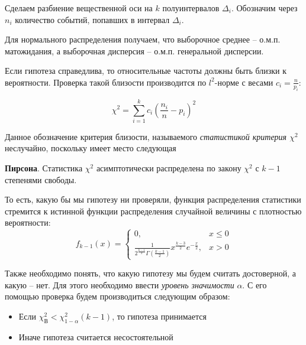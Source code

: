 Сделаем разбиение вещественной оси на $k$ полуинтервалов $\Delta_i$. Обозначим через $n_i$ количество событий, попавших в интервал $\Delta_i$.

Для нормального распределения получаем, что выборочное среднее -- о.м.п. матожидания, а выборочная дисперсия -- о.м.п. генеральной дисперсии.
	
Если гипотеза справедлива, то относительные частоты должны быть близки к вероятности. Проверка такой близости производится по $l^2$-норме с весами $c_i=\frac{n}{p_i}$:
	
\begin{equation}
	\chi^2 = \displaystyle \sum_{i=1}^{k} c_i \left( \frac{n_i}{n} - p_i \right)^2
\end{equation}
	
Данное обозначение критерия близости, называемого \textit{статистикой критерия $\chi^2$} неслучайно, поскольку имеет место следующая
	
\begin{theorem} \textbf{Пирсона}.
		Статистика $\chi^2$ асимптотически распределена по закону $\chi^2$ с $k-1$ степенями свободы.
\end{theorem}

То есть, какую бы мы гипотезу ни проверяли, функция распределения статистики стремится к истинной функции распределения случайной величины с плотностью вероятности:
\begin{equation}
	f_{k-1}(x)=
	\begin{cases}
	0, & x \leq 0 \\
	\frac{1}{2^{\frac{k-1}{2}}\Gamma\left({\frac{k-1}{2}}\right)}x^{\frac{k-3}{2}}e^{-\frac{x}{2}}, & x > 0
	\end{cases}
	\end{equation}

Также необходимо понять, что какую гипотезу мы будем считать достоверной, а какую -- нет. Для этого необходимо ввести \textit{уровень значимости} $\alpha$. С его помощью проверка будем производиться следующим образом:

\begin{itemize}
\item Если $\chi_{\text{В}}^2 < \chi_{1 - \alpha}^2(k - 1)$, то гипотеза принимается
\item Иначе гипотеза считается несостоятельной
\end{itemize}